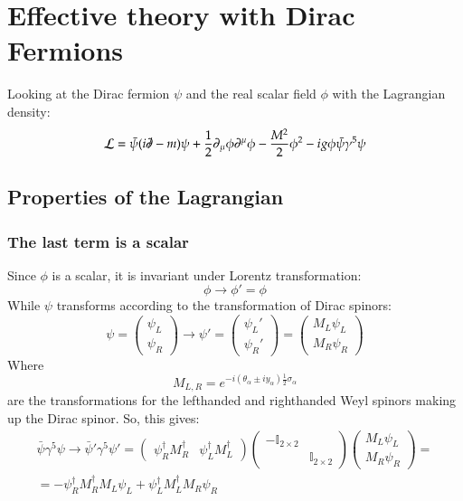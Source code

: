 \documentclass{article}
\begin{document}
\section{Effective theory with Dirac Fermions}
Looking at the Dirac fermion $\psi$ and the real scalar field $\phi$ with the Lagrangian density:
\begin{equation}
    \mathcal{L} = \bar{\psi}(i\slashed{\partial} - m)\psi + \frac{1}{2}\partial_\mu\phi \partial^\mu \phi - \frac{M^2}{2}\phi^2 - ig\phi\bar{\psi}\gamma^5\psi
\end{equation}
\subsection{Properties of the Lagrangian}
\subsubsection{The last term is a scalar}
Since $\phi$ is a scalar, it is invariant under Lorentz transformation:
\begin{equation}
    \phi \rightarrow \phi' = \phi
\end{equation}
While $\psi$ transforms according to the transformation of Dirac spinors:
\begin{equation}
    \psi = \begin{pmatrix}
        \psi_L \\ \psi_R
    \end{pmatrix} \rightarrow \psi' = \begin{pmatrix}
        \psi_L' \\ \psi_R'
    \end{pmatrix} = \begin{pmatrix}
        M_L\psi_L \\ M_R\psi_R
    \end{pmatrix}
\end{equation}
Where
\begin{equation}
    M_{L,R} = e^{-i(\theta_\alpha \pm iy_\alpha)\frac{1}{2}\sigma_\alpha}
\end{equation}
are the transformations for the lefthanded and righthanded Weyl spinors making up the Dirac spinor. So, this gives:
\begin{equation}
\begin{gathered}
    \bar{\psi}\gamma^5\psi \rightarrow \bar{\psi}'\gamma^5\psi' =
    \begin{pmatrix}
        \psi_R^\dagger M_R^\dagger & \psi_L^\dagger M_L^\dagger
    \end{pmatrix}
    \begin{pmatrix}
        -\mathbb{I}_{2\times2} & \\ & \mathbb{I}_{2\times2}
    \end{pmatrix}
    \begin{pmatrix}
        M_L\psi_L \\ M_R\psi_R
    \end{pmatrix}
    = \\ =
    - \psi_R^\dagger M_R^\dagger M_L\psi_L + \psi_L^\dagger M_L^\dagger M_R\psi_R
\end{gathered}
\end{equation}
\end{document}
